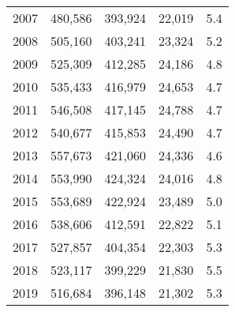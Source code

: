 \begin{table}[ht!]
\begin{tabular}{rrrrr}
2007 &      480,586 &      393,924 &       22,019 &   5.4 \\
2008 &      505,160 &      403,241 &       23,324 &   5.2 \\
2009 &      525,309 &      412,285 &       24,186 &   4.8 \\
2010 &      535,433 &      416,979 &       24,653 &   4.7 \\
2011 &      546,508 &      417,145 &       24,788 &   4.7 \\
2012 &      540,677 &      415,853 &       24,490 &   4.7 \\
2013 &      557,673 &      421,060 &       24,336 &   4.6 \\
2014 &      553,990 &      424,324 &       24,016 &   4.8 \\
2015 &      553,689 &      422,924 &       23,489 &   5.0 \\
2016 &      538,606 &      412,591 &       22,822 &   5.1 \\
2017 &      527,857 &      404,354 &       22,303 &   5.3 \\
2018 &      523,117 &      399,229 &       21,830 &   5.5 \\
2019 &      516,684 &      396,148 &       21,302 &   5.3 \\
\bottomrule\end{tabular}\end{table}
